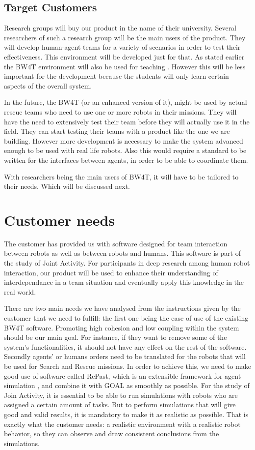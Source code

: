 \documentclass[oneside]{tudelft-report}
\begin{document}
\section{Target Customers}
Research groups will buy our product in the name of their university. Several researchers of such a research group will be the main users of the product. They will develop human-agent teams for a variety of scenarios in order to test their effectiveness. This environment will be developed just for that. As stated earlier the BW4T environment will also be used for teaching \cite{lecture}. However this will be less important for the development because the students will only learn certain aspects of the overall system. 

In the future, the BW4T (or an enhanced version of it), might be used by actual rescue teams who need to use one or more robots in their missions. They will have the need to extensively test their team before they will actually use it in the field. They can start testing their teams with a product like the one we are building. However more development is necessary to make the system advanced enough to be used with real life robots. Also this would require a standard to be written for the interfaces between agents, in order to be able to coordinate them. 

With researchers being the main users of BW4T, it will have to be tailored to their needs. Which will be discussed next.

\chapter{Customer needs}
The customer has provided us with software designed for team interaction between robots as well as between robots and humans. This software is part of the study of Joint Activity. For participants in deep research among human robot interaction, our product will be used to enhance their understanding of interdependance in a team situation and eventually apply this knowledge in the real world.

There are two main needs we have analysed from the instructions given by the customer \cite{context} that we need to fulfill: the first one being the ease of use of the existing BW4T software. Promoting high cohesion and low coupling within the system should be our main goal. For instance, if they want to remove some of the system's functionalities, it should not have any effect on the rest of the software. Secondly agents’ or humans orders need to be translated for the robots that will be used for Search and Rescue missions. In order to achieve this, we need to make good use of software called RePast, which is an extensible framework for agent simulation \cite{repast}, and combine it with GOAL as smoothly as possible. For the study of Join Activity, it is essential to be able to run simulations with robots who are assigned a certain amount of tasks. But to perform simulations that will give good and valid results, it is mandatory to make it as realistic as possible. That is exactly what the customer needs: a realistic environment with a realistic robot behavior, so they can observe and draw consistent conclusions from the simulations.
\end{document}
